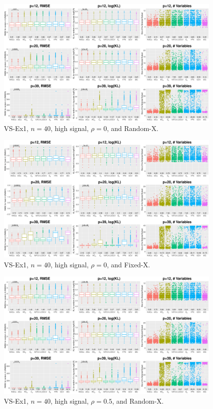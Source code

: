 \begin{figure}[!ht]
\centering
\includegraphics[width=\textwidth]{figures/supplement/randomx_VS-Ex1_n40_hsnr_rho0.eps}
\caption{VS-Ex1, $n=40$, high signal, $\rho=0$, and Random-X.}
\end{figure}
\begin{figure}[!ht]
\centering
\includegraphics[width=\textwidth]{figures/supplement/fixedx_VS-Ex1_n40_hsnr_rho0.eps}
\caption{VS-Ex1, $n=40$, high signal, $\rho=0$, and Fixed-X.}
\end{figure}
\clearpage
\begin{figure}[!ht]
\centering
\includegraphics[width=\textwidth]{figures/supplement/randomx_VS-Ex1_n40_hsnr_rho05.eps}
\caption{VS-Ex1, $n=40$, high signal, $\rho=0.5$, and Random-X.}
\end{figure}
